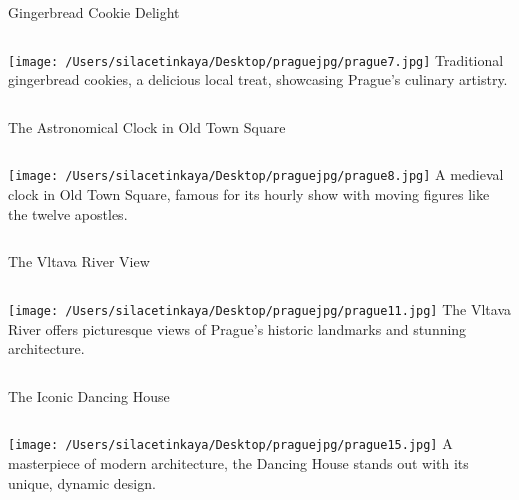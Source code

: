 \documentclass[aspectratio=169]{beamer}
\begin{document}
\begin{frame}{Gingerbread Cookie Delight}
    \begin{columns}
            \texttt{[image: /Users/silacetinkaya/Desktop/praguejpg/prague7.jpg]}
            \textbf{}  
            Traditional gingerbread cookies, a delicious local treat, showcasing Prague’s culinary artistry.
    \end{columns}
\end{frame}

\begin{frame}{The Astronomical Clock in Old Town Square}
    \begin{columns}
            \texttt{[image: /Users/silacetinkaya/Desktop/praguejpg/prague8.jpg]}
            \textbf{}  
            A medieval clock in Old Town Square, famous for its hourly show with moving figures like the twelve apostles.
    \end{columns}
\end{frame}

\begin{frame}{The Vltava River View}
    \begin{columns}
            \texttt{[image: /Users/silacetinkaya/Desktop/praguejpg/prague11.jpg]}
            \textbf{}  
            The Vltava River offers picturesque views of Prague's historic landmarks and stunning architecture.
    \end{columns}
\end{frame}

\begin{frame}{The Iconic Dancing House}
    \begin{columns}
            \texttt{[image: /Users/silacetinkaya/Desktop/praguejpg/prague15.jpg]}
            \textbf{}  
            A masterpiece of modern architecture, the Dancing House stands out with its unique, dynamic design.
    \end{columns}
\end{frame}
\end{document}

